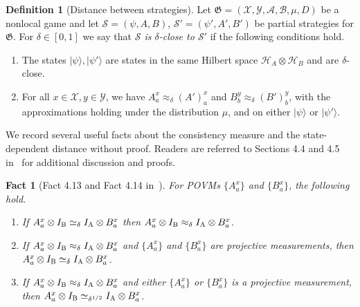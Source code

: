 \documentclass[11pt]{article}
\newtheorem{fact}[theorem]{Fact}
\theoremstyle{definition}
\newtheorem{definition}[theorem]{Definition}
\newcommand{\ket}[1]{|#1\rangle}
\newcommand{\mH}{\ensuremath{\mathcal{H}}}
\newcommand{\game}{\mathfrak{G}}
\newcommand{\strategy}{\mathscr{S}}
\newcommand{\labelstyle}[1]{\ensuremath{\textsc{#1}}\xspace}
\newcommand{\alice}{\labelstyle{A}}
\newcommand{\bob}{\labelstyle{B}}
\renewcommand{\cal}[1]{\mathcal{#1}}
\begin{document}
\begin{definition}[Distance between strategies]
  \label{def:strategy-distance}
  Let $\game = (\cal{X}, \cal{Y}, \cal{A}, \cal{B}, \mu, D)$ be a nonlocal game
  and let $\strategy = (\psi, A, B)$, $\strategy' = (\psi', A', B')$ be partial
  strategies for $\game$.
  For $\delta\in[0,1]$ we say that \emph{$\strategy$ is $\delta$-close to
    $\strategy'$} if the following conditions hold.
  \begin{enumerate}
	\item The states $\ket{\psi}, \ket{\psi'}$ are states in the same
    Hilbert space $\mH_A \otimes \mH_B$ and are $\delta$-close.
	\item For all $x \in \cal{X}, y \in \cal{Y}$, we have $A^x_a \approx_\delta
    (A')^x_a$ and $B^y_b \approx_\delta (B')^y_b$, with the approximations
    holding under the distribution $\mu$, and on either $\ket{\psi}$ or
    $\ket{\psi'}$.
  \end{enumerate}
\end{definition}

We record several useful facts about the consistency measure and the
state-dependent distance without proof.
Readers are referred to Sections 4.4 and 4.5 in~\cite{NW19} for additional
discussion and proofs.

\begin{fact}[Fact 4.13 and Fact 4.14 in~\cite{NW19}]
  \label{fact:agreement}
  For POVMs $\{A^x_a\}$ and $\{B^x_a\}$, the following hold.
  \begin{enumerate}
  \item If $A^x_a \otimes I_\bob \simeq_\delta I_\alice \otimes B^x_a$ then
    $A^x_a \otimes I_\bob \approx_\delta I_\alice \otimes B^x_a$.
    \label{item:consistency-implies-approx}
  \item If $A^x_a \otimes I_\bob \approx_\delta I_\alice \otimes B^x_a$
    \emph{and} $\{A^x_a\}$ and $\{B^x_a\}$ are projective measurements, then
    $A^x_a \otimes I_\bob \simeq_\delta I_\alice \otimes B^x_a$.
    \label{item:both-projectors-implies-consistency}
  \item If $A^x_a \otimes I_\bob \approx_\delta I_\alice \otimes B^x_a$ and
    either $\{A^x_a\}$ or $\{B^x_a\}$ is a projective measurement, then
    $A^x_a \otimes I_\bob \simeq_{\delta^{1/2}} I_\alice \otimes B^x_a$.
    \label{item:one-projector-implies-consistency}
  \end{enumerate}
\end{fact}
\end{document}
